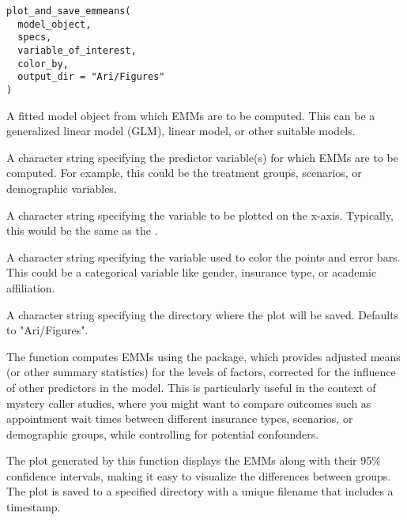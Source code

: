 \documentclass[a4paper]{book}
\begin{document}
%
\begin{Usage}
\begin{verbatim}
plot_and_save_emmeans(
  model_object,
  specs,
  variable_of_interest,
  color_by,
  output_dir = "Ari/Figures"
)
\end{verbatim}
\end{Usage}
%
\begin{Arguments}
\begin{ldescription}
\item[\code{model\_object}] A fitted model object from which EMMs are to be computed. This can be a generalized linear model (GLM), linear model, or other suitable models.

\item[\code{specs}] A character string specifying the predictor variable(s) for which EMMs are to be computed. For example, this could be the treatment groups, scenarios, or demographic variables.

\item[\code{variable\_of\_interest}] A character string specifying the variable to be plotted on the x-axis. Typically, this would be the same as the .

\item[\code{color\_by}] A character string specifying the variable used to color the points and error bars. This could be a categorical variable like gender, insurance type, or academic affiliation.

\item[\code{output\_dir}] A character string specifying the directory where the plot will be saved. Defaults to "Ari/Figures".
\end{ldescription}
\end{Arguments}
%
\begin{Details}
The function computes EMMs using the  package, which provides adjusted means (or other summary statistics) for the levels of factors, corrected for the influence of other predictors in the model. This is particularly useful in the context of mystery caller studies, where you might want to compare outcomes such as appointment wait times between different insurance types, scenarios, or demographic groups, while controlling for potential confounders.

The plot generated by this function displays the EMMs along with their 95\% confidence intervals, making it easy to visualize the differences between groups. The plot is saved to a specified directory with a unique filename that includes a timestamp.
\end{Details}
\end{document}
